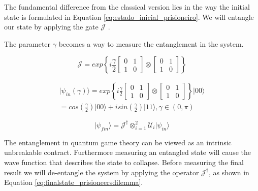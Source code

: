 The fundamental difference from the classical version lies in the way the initial state is formulated in Equation \ref{eq:estado_inicial_prisioneiro}. We will entangle our state by applying the gate $\mathcal{J}$ \cite{Letters2002}\cite{Eisert2008}. 

The parameter $\gamma$ becomes a way to measure the entanglement in the system\cite{Eisert2008}.

\begin{equation}
\label{eq:matrix_exponencial_esoterica}
\mathcal{J}=exp\left\{ i\frac{\gamma}{2}\left[\begin{array}{cc}
0 & 1\\
1 & 0
\end{array}\right]\otimes\left[\begin{array}{cc}
0 & 1\\
1 & 0
\end{array}\right]\right\}
\end{equation} 

\begin{equation}
\label{eq:estado_inicial_prisioneiro}
\begin{split}
\vert\psi_{in}(\gamma)\rangle=exp\left\{ i\frac{\gamma}{2}\left[\begin{array}{cc}
0 & 1\\
1 & 0
\end{array}\right]\otimes\left[\begin{array}{cc}
0 & 1\\
1 & 0
\end{array}\right]\right\} \vert00\rangle \\
=cos(\frac{\gamma}{2})\vert00\rangle+isin(\frac{\gamma}{2})\vert11\rangle,\gamma\in(0,\pi)
\end{split}
\end{equation}

\begin{equation}
\vert\psi_{fin}\rangle= \mathcal{J}^{\dagger} \otimes_{i=1}^{2}\mathcal{U}_{i}\vert\psi_{in}\rangle
\label{eq:finalstate_prisioneersdilemma}
\end{equation}

The entanglement in quantum game theory can be viewed as an intrinsic unbreakable contract. Furthermore measuring an entangled state will cause the wave function that describes the state to collapse. Before measuring the final result we will de-entangle the system by applying the operator $\mathcal{J}^{\dagger}$, as shown in Equation \ref{eq:finalstate_prisioneersdilemma}.

